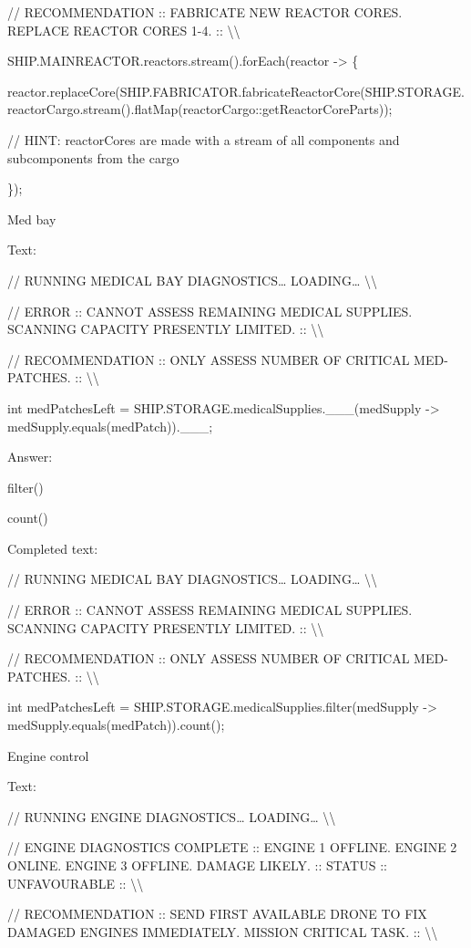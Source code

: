 \documentclass[
]{article}
\begin{document}
// RECOMMENDATION :: FABRICATE NEW REACTOR CORES. REPLACE REACTOR CORES
1-4. :: \textbackslash\textbackslash{}

SHIP.MAINREACTOR.reactors.stream().forEach(reactor -\textgreater{} \{

reactor.replaceCore(SHIP.FABRICATOR.fabricateReactorCore(SHIP.STORAGE.reactorCargo.stream().flatMap(reactorCargo::getReactorCoreParts));

// HINT: reactorCores are made with a stream of all components and
subcomponents from the cargo

\});

Med bay

Text:

// RUNNING MEDICAL BAY DIAGNOSTICS\ldots{} LOADING\ldots{}
\textbackslash\textbackslash{}

// ERROR :: CANNOT ASSESS REMAINING MEDICAL SUPPLIES. SCANNING CAPACITY
PRESENTLY LIMITED. :: \textbackslash\textbackslash{}

// RECOMMENDATION :: ONLY ASSESS NUMBER OF CRITICAL MED-PATCHES. ::
\textbackslash\textbackslash{}

int medPatchesLeft = SHIP.STORAGE.medicalSupplies.\_\_\_(medSupply
-\textgreater{} medSupply.equals(medPatch)).\_\_\_;

Answer:

filter()

count()

Completed text:

// RUNNING MEDICAL BAY DIAGNOSTICS\ldots{} LOADING\ldots{}
\textbackslash\textbackslash{}

// ERROR :: CANNOT ASSESS REMAINING MEDICAL SUPPLIES. SCANNING CAPACITY
PRESENTLY LIMITED. :: \textbackslash\textbackslash{}

// RECOMMENDATION :: ONLY ASSESS NUMBER OF CRITICAL MED-PATCHES. ::
\textbackslash\textbackslash{}

int medPatchesLeft = SHIP.STORAGE.medicalSupplies.filter(medSupply
-\textgreater{} medSupply.equals(medPatch)).count();

Engine control

Text:

// RUNNING ENGINE DIAGNOSTICS\ldots{} LOADING\ldots{}
\textbackslash\textbackslash{}

// ENGINE DIAGNOSTICS COMPLETE :: ENGINE 1 OFFLINE. ENGINE 2 ONLINE.
ENGINE 3 OFFLINE. DAMAGE LIKELY. :: STATUS :: UNFAVOURABLE ::
\textbackslash\textbackslash{}

// RECOMMENDATION :: SEND FIRST AVAILABLE DRONE TO FIX DAMAGED ENGINES
IMMEDIATELY. MISSION CRITICAL TASK. :: \textbackslash\textbackslash{}
\end{document}
